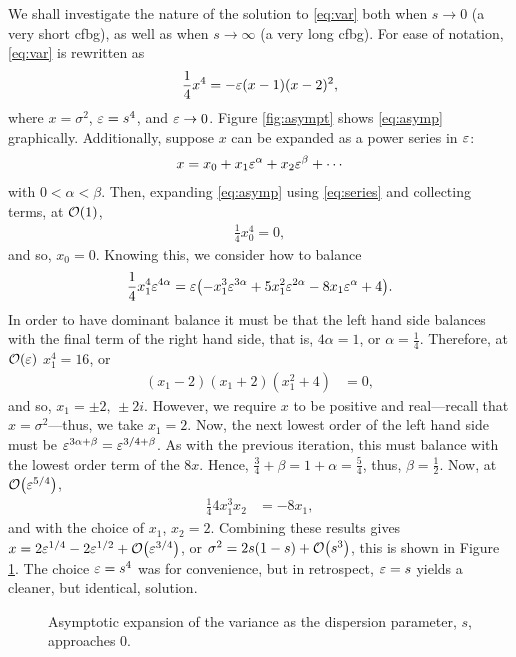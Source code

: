 We shall investigate the nature of the solution to \eqref{eq:var} both when $s \rightarrow 0$ (a very short \gls{cfbg}), as well as when $s \rightarrow \infty$ (a very long \gls{cfbg}). For ease of notation, \eqref{eq:var} is rewritten as
\begin{align}
\label{eq:asymp}
\frac{1}{4} x^4 = - \varepsilon (x - 1)(x - 2)^2,
\end{align}
where $x = \sigma^2$, $\varepsilon = s^4$, and $\varepsilon \rightarrow 0$. Figure \ref{fig:asympt} shows \eqref{eq:asymp} graphically. Additionally, suppose $x$ can be expanded as a power series in $\varepsilon$:
\begin{align}
\label{eq:series}
x = x_0 + x_1 \varepsilon^\alpha + x_2 \varepsilon^\beta + \cdots
\end{align}
with $0 < \alpha < \beta$. Then, expanding \eqref{eq:asymp} using \eqref{eq:series} and collecting terms, at $\bigO{1}$,
\begin{align*}
\frac{1}{4} x_0^4 = 0,
\end{align*}
and so, $x_0 = 0$. Knowing this, we consider how to balance
\begin{align*}
\frac{1}{4} x_1^4 \eps^{4\alpha} = \eps \left( -x_1^3 \eps^{3\alpha} + 5x_1^2 \eps^{2\alpha} - 8x_1 \eps^\alpha + 4 \right).
\end{align*}
In order to have dominant balance it must be that the left hand side balances with the final term of the right hand side, that is, $4\alpha = 1$, or $\alpha = \frac{1}{4}$. Therefore, at $\bigO{\eps}$ $x_1^4 = 16$, or
\begin{align*}
(x_1 - 2)(x_1 + 2)(x_1^2 + 4) &= 0,
\end{align*}
and so, $x_1 = \pm 2, \, \pm 2 i$. However, we require $x$ to be positive and real---recall that $x = \sigma^2$---thus, we take $x_1 = 2$. Now, the next lowest order of the left hand side must be $\varepsilon^{3\alpha + \beta} = \varepsilon^{3/4 + \beta}$. As with the previous iteration, this must balance with the lowest order term of the $8x$. Hence, $\frac{3}{4} + \beta = 1 + \alpha = \frac{5}{4}$, thus, $\beta = \frac{1}{2}$. Now, at $\bigO{\eps^{5/4}}$,
\begin{align*}
\frac{1}{4} 4 x_1^3 x_2 &= -8x_1,
\end{align*}
and with the choice of $x_1$, $x_2 = 2$. Combining these results gives $x = 2 \eps^{1/4} - 2 \eps^{1/2} + \bigO{\eps^{3/4}}$, or $\sigma^2 = 2 s \left( 1 - s \right) + \bigO{s^3}$,
this is shown in Figure \ref{fig:lims0}. The choice $\varepsilon = s^4$ was for convenience, but in retrospect, $\varepsilon = s$ yields a cleaner, but identical, solution. \\
\begin{figure}[tbp]

\caption[Asymptotic expansion of the variance as the dispersion parameter approaches 0.]{Asymptotic expansion of the variance as the dispersion parameter, $s$, approaches $0$.}
\label{fig:lims0}
\end{figure}

